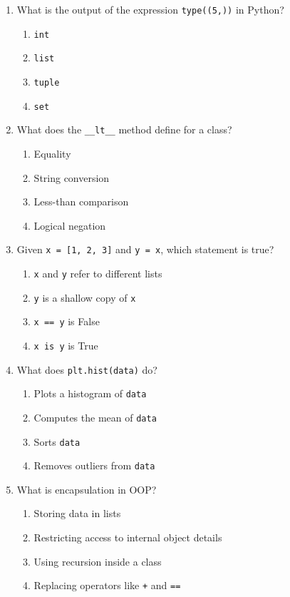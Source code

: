 \documentclass[12pt]{article}
\begin{document}
\begin{enumerate}[label=\arabic*.]

\item What is the output of the expression \texttt{type((5,))} in Python?  
\begin{enumerate}[label=\Alph*.]
\item \texttt{int}
\item \texttt{list}
\item \texttt{tuple}
\item \texttt{set}
\end{enumerate}

\item What does the \texttt{\_\_lt\_\_} method define for a class?  
\begin{enumerate}[label=\Alph*.]
\item Equality
\item String conversion
\item Less-than comparison
\item Logical negation
\end{enumerate}

\item Given \texttt{x = [1, 2, 3]} and \texttt{y = x}, which statement is true?  
\begin{enumerate}[label=\Alph*.]
\item \texttt{x} and \texttt{y} refer to different lists
\item \texttt{y} is a shallow copy of \texttt{x}
\item \texttt{x == y} is False
\item \texttt{x is y} is True
\end{enumerate}

\item What does \texttt{plt.hist(data)} do?  
\begin{enumerate}[label=\Alph*.]
\item Plots a histogram of \texttt{data}
\item Computes the mean of \texttt{data}
\item Sorts \texttt{data}
\item Removes outliers from \texttt{data}
\end{enumerate}

\item What is encapsulation in OOP?  
\begin{enumerate}[label=\Alph*.]
\item Storing data in lists
\item Restricting access to internal object details
\item Using recursion inside a class
\item Replacing operators like \texttt{+} and \texttt{==}
\end{enumerate}


\end{enumerate}
\end{document}
